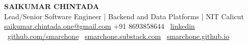 \documentclass[a4paper,10pt]{article}
\begin{document}
\begin{center}
{\LARGE \color{myblue}\textbf{SAIKUMAR CHINTADA}} \\
Lead/Senior Software Engineer | Backend and Data Platforms | NIT Calicut \\
\href{mailto:saikumar.chintada.one@gmail.com}{saikumar.chintada.one@gmail.com} \;\; +91 8693858644 \; \faLinkedin\, \href{https://linkedin.com/in/saikumar-chintada-a72671b1}{linkedin} \\
\faGithub\, \href{https://github.com/smarchone/}{github.com/smarchone} \; \faMedium\, \href{https://smarchone.substack.com/}{smarchone.substack.com} \; \faUser\, \href{https://smarchone.github.io/}{smarchone.github.io}
\end{center}

\vspace{0.7em}
\end{document}
